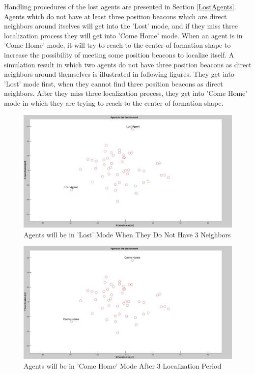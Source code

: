 Handling procedures of the lost agents are presented in Section \ref{LostAgents}. Agents which do not have at least three position beacons which are direct neighbors around itselves will get into the 'Lost' mode, and if  they miss three localization process they will get into 'Come Home' mode. When an agent is in 'Come Home' mode, it will try to reach to the center of formation shape to increase the possibility of meeting some position beacons to localize itself. A simulation result in which two agents do not have three position beacons as direct neighbors around themselves is illustrated in following figures. They get into 'Lost' mode first, when they cannot find three position beacons as direct neighbors. After they miss three localization process, they get into 'Come Home' mode in which they are trying to reach to the center of formation shape.
		
\begin{figure}[H]
\caption{Agents will be in 'Lost' Mode When They Do Not Have 3 Neighbors} \label{lost_ref}
\centering
\centerline{\includegraphics[scale = 0.25]{Lost-2-2}}
\end{figure} 

\begin{figure}[H]
\captionsetup{format=hang,justification=centerfirst}
\caption{Agents will be in 'Come Home' Mode After 3 Localization Period} \label{come_home_ref}
\centerline{\includegraphics[scale = 0.25]{Lost-2-3}}
\end{figure} 		


